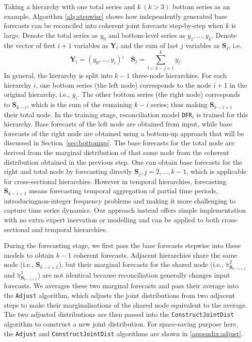 \documentclass[a4paper,review,12pt,authoryear]{elsarticle}
\let\code=\texttt
\newcommand{\bY}{\mathbf{Y}}
\begin{document}
  Taking a hierarchy with one total series and $k~(k>3)$ bottom series as an example, Algorithm \ref{alg:stepwise} shows how independently generated base forecasts can be reconciled into coherent joint forecasts step-by-step when $k$ is large. 
  Denote the total series as $y_0$ and bottom-level series as $y_1, \dots, y_k$. 
  Denote the vector of first $i+1$ variables as $\mathbf{Y}_i$ and the sum of last $j$ variables as $\mathbf{S}_j$, i.e.
  \[
    \bY_i = (y_0, \dots, y_i)' \quad \mathbf{S}_j = \sum_{l=k-j+1}^{k} y_l.
  \] 
  In general, the hierarchy is split into $k-1$ three-node hierarchies.  
  For each hierarchy $i$, one bottom series (the left node) corresponds to the node $i+1$ in the original hierarchy, i.e., $y_{i}$. The other bottom series (the right node) corresponds to $\mathbf{S}_{k-i}$, which is the sum of the remaining $k-i$ series; thus making $\mathbf{S}_{k-i+1}$ their total node.
  In the training stage, reconciliation model \code{DFR}$_i$ is trained for this hierarchy.
  Base forecasts of the left node are obtained from input, while base forecasts of the right node are obtained using a bottom-up approach that will be discussed in Section~\ref{sec:bottomup}. 
  The base forecasts for the total node are derived from the marginal distribution of that same node from the coherent distribution obtained in the previous step.
  One can obtain base forecasts for the right and total node by forecasting directly $\mathbf{S}_{j}, j=2,\dots,k-1$, which is applicable for cross-sectional hierarchies.
  However in temporal hierarchies, forecasting $\mathbf{S}_{k-i+1}$ means forecasting temporal aggregation of partial time periods, introducingnon-integer frequency problems and making it more challenging to capture time series dynamics.
  Our approach instead offers simple implementation with no extra expert inervation or modelling and can be applied to both cross-sectional and temporal hierarchies. 

  During the forecasting stage, we first pass the base forecasts stepwise into these models to obtain $k-1$ coherent forecasts.
  Adjacent hierarchies share the same node (i.e., $\mathbf{S}_{k-i+1}$), but their marginal forecasts for the shared node (i.e., $\tilde\pi^{2}_{\mathbf{S}_{k-i+1}}$ and $\tilde\pi^{1}_{\mathbf{S}_{k-i+1}}$) are not identical because reconciliation generally changes input forecasts.
  We averages these two marginal forecasts and pass their average into the \code{Adjust} algorithm, which adjusts the joint distributions from two adjacent steps to make their marginalisations of the shared node equivalent to the average.
  The two adjusted distributions are then passed into the \code{ConstructJointDist} algorithm to construct a new joint distribution.
  For space-saving purpose here, the \code{Adjust} and \code{ConstructJointDist} algorithms are shown in \ref{appendix:adjust}.
\end{document}
